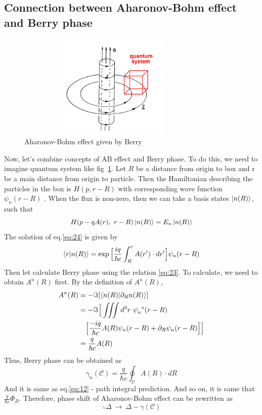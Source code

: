 \documentclass[%
 reprint,
 amsmath,amssymb,
 aps,
]{revtex4-1}
\begin{document}
\subsection{\label{sec:level3.3}Connection between Aharonov-Bohm effect and Berry phase}

\begin{figure}[h]
    \centering
    \includegraphics[width=9cm, height=5cm]{AB2.png}
    \caption{Aharonov-Bohm effect given by Berry\cite{RR}}
    \label{fig:2}
\end{figure}

Now, let's combine concepts of AB effect and Berry phase. To do this, we need to imagine quantum system like fig~\ref{fig:2}. Let $R$ be a distance from origin to box and r be a main distance from origin to particle. Then the Hamiltonian describing the particles in the box is \(H(p,r-R)\) with corresponding wave function $\psi_n(r-R)$ \cite{pt}. When the flux is non-zero, then we can take a basis states $\ket{n(R)}$, such that
\begin{equation}\label{eq:24}
H(p-qA(r),\ r-R)\ket{n(R)}=E_n\ket{n(R)} 
\end{equation}
The solution of eq.\eqref{eq:24} is given by
\begin{equation}\label{eq:25}
\braket{r|n(R)}=\exp\Big[\frac{iq}{\hbar c}\int_{R}^{r} A(r')\cdot dr'\Big]\psi_n(r-R)
\end{equation}
Then let calculate Berry phase using the relation \eqref{eq:23}. To calculate, we need to obtain $A^n(R)$ first. By the definition of $A^n(R)$,
\begin{multline}\label{eq:26}
\begin{split}
A^n(R)&= -\Im[\braket{n(R)|\partial_Rn(R)}]\\
&= -\Im\Big[\iiint d^3r\ \tensor{\psi}{_n^*}(r-R)\\
&\quad \Big[\frac{-iq}{\hbar c}A(R)\psi_n(r-R)+\partial_R\psi_n(r-R)\Big]\Big]
\\ &= \frac{q}{\hbar c}A(R)
\end{split}
\end{multline}
Thus, Berry phase can be obtained as
\begin{equation}\label{eq:27}
\gamma_n(\mathcal{C})=\frac{q}{\hbar c}\oint_{\mathcal{C}}A(R)\cdot dR
\end{equation}
And it is same as eq.\eqref{eq:12} - path integral prediction. 
And so on, it is same that $\frac{q}{\hbar c}\Phi_B$.
Therefore, phase shift of Aharonov-Bohm effect can be rewritten as
\begin{equation}\label{eq:28}
\therefore \Delta\ \rightarrow\ \Delta-\gamma(\mathcal{C})
\end{equation}
\end{document}
